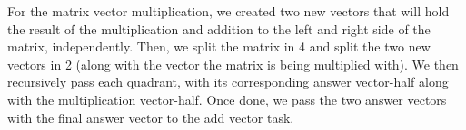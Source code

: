 \documentclass[11pt,letterpaper]{exam}
\begin{document}
\begin{questions}
\begin{parts}
\begin{subparts}
								\quad For the matrix vector multiplication, we created two new vectors that will hold the result of the multiplication and addition to the left and right side of the matrix, independently. Then, we split the matrix in 4 and split the two new vectors in 2 (along with the vector the matrix is being multiplied with). We then recursively pass each quadrant, with its corresponding answer vector-half along with the multiplication vector-half. Once done, we pass the two answer vectors with the final answer vector to the add vector task. 
								
					\end{subparts}
			\end{parts}	
	\end{questions}
\end{document}
